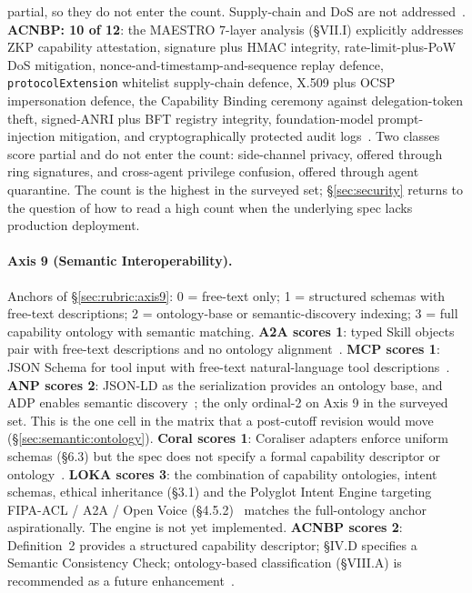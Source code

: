 partial, so they do not enter the count. Supply-chain and
DoS are not addressed~\cite{spec_loka}. \textbf{ACNBP: 10 of
12}: the MAESTRO 7-layer analysis (\S VII.I) explicitly
addresses ZKP capability attestation, signature plus HMAC
integrity, rate-limit-plus-PoW DoS mitigation,
nonce-and-timestamp-and-sequence replay defence,
\texttt{protocolExtension} whitelist supply-chain
defence, X.509 plus OCSP impersonation defence, the
Capability Binding ceremony against delegation-token
theft, signed-ANRI plus BFT registry integrity,
foundation-model prompt-injection mitigation, and
cryptographically protected audit logs~\cite{spec_acnbp}.
Two classes score partial and do not enter the count:
side-channel privacy, offered through ring signatures,
and cross-agent privilege confusion, offered through
agent quarantine. The count is the
highest in the surveyed set; \S\ref{sec:security} returns
to the question of how to read a high count when the
underlying spec lacks production deployment.

\paragraph{Axis 9 (Semantic Interoperability).}
Anchors of \S\ref{sec:rubric:axis9}: 0 = free-text only;
1 = structured schemas with free-text descriptions; 2 =
ontology-base or semantic-discovery indexing; 3 = full
capability ontology with semantic matching. \textbf{A2A
scores 1}: typed Skill objects pair with free-text
descriptions and no ontology alignment~\cite{spec_a2a}.
\textbf{MCP scores 1}: JSON Schema for tool input with
free-text natural-language tool descriptions~\cite{spec_mcp}.
\textbf{ANP scores 2}: JSON-LD as the serialization
provides an ontology base, and ADP enables semantic
discovery~\cite{spec_anp}; the only ordinal-2 on Axis 9
in the surveyed set. This is the one cell in the matrix
that a post-cutoff revision would move
(\S\ref{sec:semantic:ontology}). \textbf{Coral scores 1}: Coraliser
adapters enforce uniform schemas (\S6.3) but the spec
does not specify a formal capability descriptor or
ontology~\cite{spec_coral}. \textbf{LOKA scores 3}: the
combination of capability ontologies, intent schemas,
ethical inheritance (\S3.1) and the Polyglot Intent
Engine targeting FIPA-ACL / A2A / Open Voice
(\S4.5.2)~\cite{spec_loka} matches the full-ontology
anchor aspirationally. The engine is not yet
implemented. \textbf{ACNBP scores 2}: Definition~2
provides a structured capability descriptor; \S IV.D
specifies a Semantic Consistency Check; ontology-based
classification (\S VIII.A) is recommended as a future
enhancement~\cite{spec_acnbp}.

